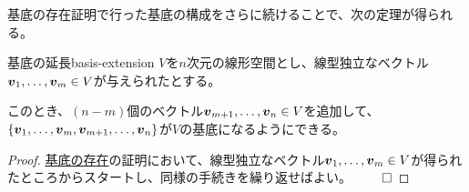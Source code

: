 \documentclass[../../../topic_linear-algebra]{subfiles}
\begin{document}
基底の存在証明で行った基底の構成をさらに続けることで、次の定理が得られる。

\begin{theorem}{基底の延長}{basis-extension}
  $V$を$n$次元の線形空間とし、線型独立なベクトル$\vb*{v}_1, \dots, \vb*{v}_m \in V$が与えられたとする。

  このとき、$(n-m)$個のベクトル$\vb*{v}_{m+1}, \dots, \vb*{v}_n \in V$を追加して、$\{ \vb*{v}_1, \dots, \vb*{v}_m, \vb*{v}_{m+1}, \dots, \vb*{v}_n \}$が$V$の基底になるようにできる。
\end{theorem}

\begin{proof}
  \hyperref[thm:existence-of-basis]{基底の存在}の証明において、線型独立なベクトル$\vb*{v}_1, \dots, \vb*{v}_m \in V$が得られたところからスタートし、同様の手続きを繰り返せばよい。 $\qed$
\end{proof}
\end{document}

